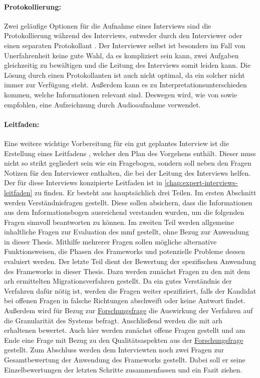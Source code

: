 \paragraph{Protokollierung:} Zwei geläufige Optionen für die Aufnahme eines Interviews sind die Protokollierung während des Interviews, entweder durch den Interviewer oder einen separaten Protokollant \cite{seaman2008qualitative,Runeson2009}.
Der Interviewer selbst ist besonders im Fall von Unerfahrenheit keine gute Wahl, da es kompliziert sein kann, zwei Aufgaben gleichzeitig zu bewältigen und die Leitung des Interviews somit leiden kann.
Die Lösung durch einen Protokollanten ist auch nicht optimal, da ein solcher nicht immer zur Verfügung steht.
Außerdem kann es zu Interpretationsunterschieden kommen, welche Informationen relevant sind.
Deswegen wird, wie von  sowie  empfohlen, eine Aufzeichnung durch Audioaufnahme verwendet.

\paragraph{Leitfaden:} Eine weitere wichtige Vorbereitung für ein gut geplantes Interview ist die Erstellung eines Leitfadens \cite{seaman2008qualitative,hove-anda-2005}, welcher den Plan des Vorgehens enthält.
Dieser muss nicht so strikt gegliedert sein wie ein Fragebogen, sondern soll neben den Fragen Notizen für den Interviewer enthalten, die bei der Leitung des Interviews helfen.
Der für diese Interviews konzipierte Leitfaden ist in \cref{chap:expert-interviews-leitfaden} zu finden.
Er besteht aus hauptsächlich drei Teilen.
Im ersten Abschnitt werden Verständnisfragen gestellt.
Diese sollen absichern, dass die Informationen aus dem Informationsbogen ausreichend verstanden wurden, um die folgenden Fragen sinnvoll beantworten zu können.
Im zweiten Teil werden allgemeine inhaltliche Fragen zur Evaluation des \gls{mmf} gestellt, ohne Bezug zur Anwendung in dieser Thesis.
Mithilfe mehrerer Fragen sollen mögliche alternative Funktionsweisen, die Phasen des Frameworks und potenzielle Probleme dessen evaluiert werden.
Der letzte Teil dient der Bewertung der spezifischen Anwendung des Frameworks in dieser Thesis.
Dazu werden zunächst Fragen zu den mit dem \gls{arh} ermittelten Migrationsverfahren gestellt.
Da ein gutes Verständnis der Verfahren dafür nötig ist, werden die Fragen weiter spezifiziert, falls der Kandidat bei offenen Fragen in falsche Richtungen abschweift oder keine Antwort findet.
Außerdem wird für Bezug zur \hyperref[forschungsfrage:1]{Forschungsfrage} die Auswirkung der Verfahren auf die Granularität des Systems befragt.
Anschließend werden die mit \gls{arh} erhaltenen \bpp bewertet.
Auch hier werden zunächst offene Fragen gestellt und am Ende eine Frage mit Bezug zu den Qualitätsaspekten aus der \hyperref[forschungsfrage:1]{Forschungsfrage} gestellt.
Zum Abschluss werden dem Interviewten noch zwei Fragen zur Gesamtbewertung der Anwendung des Frameworks gestellt.
Dabei soll er seine Einzelbewertungen der letzten Schritte zusammenfassen und ein Fazit ziehen.

